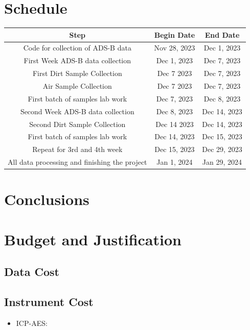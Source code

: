 \documentclass[12pt]{article}
\begin{document}
\section{Schedule}
\begin{center}
\begin{tabular}{|c|c|c|}
 \hline
 \textbf{Step} & \textbf{Begin Date} & \textbf{End Date} \\
 \hline \hline
Code for collection of ADS-B data & Nov 28, 2023 & Dec 1, 2023 \\
\hline
First Week ADS-B data collection & Dec 1, 2023 & Dec 7, 2023 \\
\hline
First Dirt Sample Collection & Dec 7 2023 & Dec 7, 2023 \\
\hline
Air Sample Collection & Dec 7 2023 & Dec 7, 2023 \\
\hline
First batch of samples lab work & Dec 7, 2023 & Dec 8, 2023 \\ 
\hline
Second Week ADS-B data collection & Dec 8, 2023 & Dec 14, 2023 \\
\hline
Second Dirt Sample Collection & Dec 14 2023 & Dec 14, 2023 \\
\hline
First batch of samples lab work & Dec 14, 2023 & Dec 15, 2023 \\ 
\hline
Repeat for 3rd and 4th week & Dec 15, 2023 & Dec 29, 2023\\
\hline
All data processing and finishing the project& Jan 1, 2024 & Jan 29, 2024\\
\hline
\end{tabular}
\end{center}
\section{Conclusions}
\section{Budget and Justification}
\subsection{Data Cost}

\subsection{Instrument Cost}
\begin{itemize}
    \item ICP-AES: 
\end{itemize}

\newpage
\printbibliography
\end{document}
